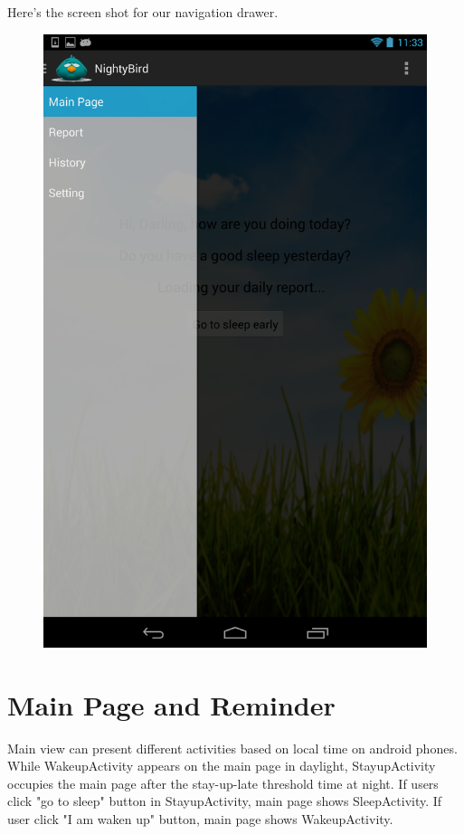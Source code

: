 \documentclass[14pt]{extreport}
\begin{document}
Here's the screen shot for our navigation drawer.
\begin{figure}[h]
\begin{center}
\includegraphics[width=5in]{drawer}
\end{center}
\end{figure}

\chapter{Main Page and Reminder}
Main view can present different activities based on local time on android phones. While WakeupActivity appears on the main page in daylight, StayupActivity occupies the main page after the stay-up-late threshold time at night. If users click "go to sleep" button in StayupActivity, main page shows SleepActivity. If user click "I am waken up" button, main page shows WakeupActivity. 
\end{document}
